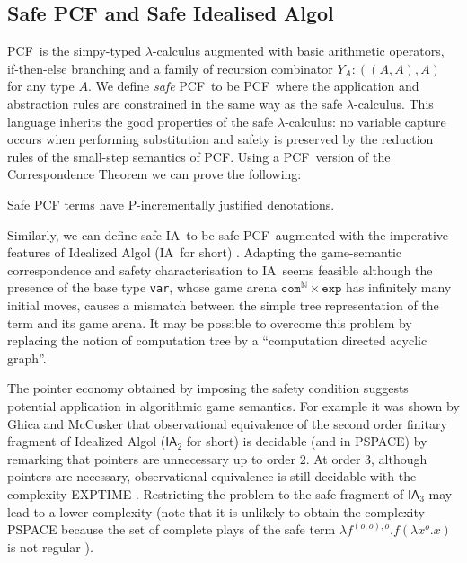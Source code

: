 \documentclass{llncs}
\newcommand\nat{\mathbb{N}}
\newcommand\ialgol{\textsf{IA}}
\newcommand\iacom{\texttt{com}}
\newcommand\iaexp{\texttt{exp}}
\newcommand\iavar{\texttt{var}}
\newcommand\pcf{\textsf{PCF}}
\begin{document}
\subsection*{Safe PCF and Safe Idealised Algol}

\pcf\ is the simpy-typed $\lambda$-calculus augmented with basic
arithmetic operators, if-then-else branching and a family of recursion
combinator $Y_A : ((A,A),A)$ for any type $A$.  We define
\emph{safe} \pcf\ to be \pcf\ where the application and abstraction
rules are constrained in the same way as the safe $\lambda$-calculus.
This language inherits the good properties of the safe
$\lambda$-calculus: no variable capture occurs when performing
substitution and safety is preserved by the reduction rules of the
small-step semantics of \pcf. Using a \pcf\ version of the
Correspondence Theorem we can prove the following:
\begin{theorem}
\label{thm:safepcfpincr}
Safe PCF terms have P-incrementally justified denotations.
\end{theorem}

Similarly, we can define safe \ialgol\ to be safe \pcf\ augmented with
the imperative features of Idealized Algol (\ialgol\ for short)
\cite{Reynolds81}.  Adapting the game-semantic correspondence and
safety characterisation to \ialgol\ seems feasible although the
presence of the base type \iavar, whose game arena $\iacom^{\nat}
\times \iaexp$ has infinitely many initial moves, causes a mismatch
between the simple tree representation of the term and its game
arena. It may be possible to overcome this problem by replacing the
notion of computation tree by a ``computation directed acyclic
graph''.

The pointer economy obtained by imposing the safety condition suggests
potential application in algorithmic game semantics.  For example it
was shown by Ghica and McCusker \cite{ghicamccusker00} that
observational equivalence of the second order finitary fragment of
Idealized Algol ($\ialgol_2$ for short) is decidable (and in PSPACE)
by remarking that pointers are unnecessary up to order $2$. At order
$3$, although pointers are necessary, observational equivalence is
still decidable with the complexity EXPTIME
\cite{DBLP:conf/fossacs/MurawskiW05}. Restricting the problem to the
safe fragment of $\ialgol_3$ may lead to a lower complexity (note that
it is unlikely to obtain the complexity PSPACE because the set of
complete plays of the safe term $\lambda f^{(o,o),o} . f (\lambda x^o
. x)$ is not regular \cite{DBLP:journals/apal/Ong04}).
\end{document}
